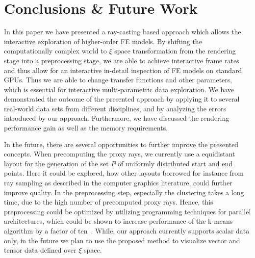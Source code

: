 \documentclass[review,journal]{vgtc}         %
\begin{document}
\section{Conclusions \& Future Work}\label{sec:conclusions}
In this paper we have presented a ray-casting based approach which allows the interactive exploration of higher-order FE models. By shifting the computationally complex world to $\xi$ space transformation from the rendering stage into a preprocessing stage, we are able to achieve interactive frame rates and thus allow for an interactive in-detail inspection of FE models on standard GPUs. Thus we are able to change transfer functions and other parameters, which is essential for interactive multi-parametric data exploration. We have demonstrated the outcome of the presented approach by applying it to several real-world data sets from different disciplines, and by analyzing the errors introduced by our approach. Furthermore, we have discussed the rendering performance gain as well as the memory requirements.

In the future, there are several opportunities to further improve the presented concepts. When precomputing the proxy rays, we currently use a equidistant layout for the generation of the set $P$ of uniformly distributed start and end points. Here it could be explored, how other layouts borrowed for instance from ray sampling as described in the computer graphics literature, could further improve quality. In the preprocessing step, especially the clustering takes a long time, due to the high number of precomputed proxy rays. Hence, this preprocessing could be optimized by utilizing programming techniques for parallel architectures, which could be shown to increase performance of the k-means algorithm by a factor of ten~\cite{mess10gpuclustering}. While, our approach currently supports scalar data only, in the future we plan to use the proposed method to visualize vector and tensor data defined over $\xi$ space.




\end{document}
